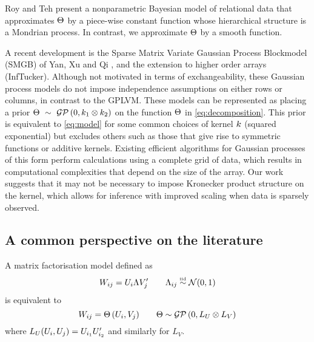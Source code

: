 Roy and Teh \citep{Roy2009} present a nonparametric Bayesian model of relational data that approximates $\Theta$ by a piece-wise constant function whose hierarchical structure is a Mondrian process. In contrast, we approximate $\Theta$ by a smooth function.

A recent development is the Sparse Matrix Variate Gaussian Process Blockmodel (SMGB) of Yan, Xu and Qi \cite{Yan2011}, and the extension to higher order arrays \cite{Xu2012} (InfTucker).
Although not motivated in terms of exchangeability, these Gaussian process models do not impose independence assumptions on either rows or columns, in contrast to the GPLVM.
These models can be represented as placing a prior ${\Theta \ \sim\  \mathcal{GP}\,(0, k_1 \otimes k_2)}$ on the function $\Theta$ in \eqref{eq:decomposition}.
This prior is equivalent to \eqref{eq:model} for some common choices of kernel $k$ (\eg squared exponential) but excludes others such as those that give rise to symmetric functions or additive kernels.
Existing efficient algorithms for Gaussian processes of this form \citep[e.g.][]{Saatci2011} perform calculations using a complete grid of data, which results in computational complexities that depend on the size of the array.
Our work suggests that it may not be necessary to impose Kronecker product structure on the kernel, which allows for inference with improved scaling when data is sparsely observed.

\subsection{A common perspective on the literature}


\begin{prop}
\label{prop:matrixfactorisation}
A matrix factorisation model defined as
\begin{equation}
W_{ij} = U_i\Lambda V_j' \quad \quad \Lambda_{ij} \overset{\mbox{\tiny iid}}{\sim} \mathcal{N} (0, 1)
\end{equation}
is equivalent to
\begin{equation}
W_{ij} = \Theta\,(U_i, V_j) \quad \quad \Theta \sim \mathcal{GP}\,(0, L_U \otimes L_V)
\end{equation}
where $L_U(U_i, U_j) = U_{i_1}U_{i_2}'$ and similarly for $L_V$.
\end{prop}

